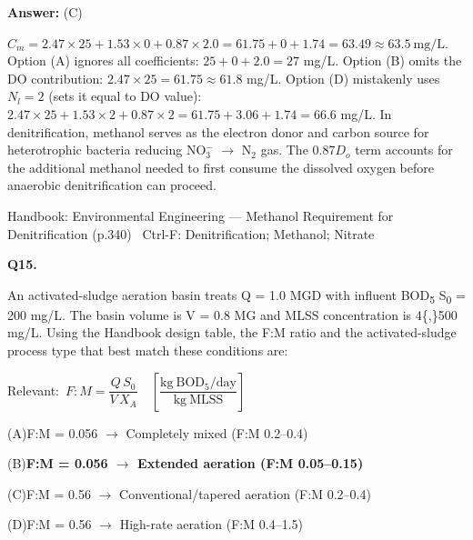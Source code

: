\documentclass[11pt]{article}
\newcommand{\correct}[1]{\textbf{#1}\;{\color{accent}$\checkmark$}}
\newcommand{\optline}[2]{\par\noindent\hspace{1.2em}(#1)\hspace{0.6em}#2}
\begin{document}
\vspace{2pt}\par\noindent\colorbox{boxbg}{\parbox{\dimexpr\linewidth-2\fboxsep\relax}{%
\vspace{2pt}\textbf{Answer:} (C)\par\vspace{2pt}
{\small $C_m = 2.47\times25 + 1.53\times0 + 0.87\times2.0 = 61.75 + 0 + 1.74 = 63.49\approx63.5\ \mathrm{mg/L}$. Option (A) ignores all coefficients: $25+0+2.0 = 27$ mg/L. Option (B) omits the DO contribution: $2.47\times25 = 61.75\approx61.8$ mg/L. Option (D) mistakenly uses $N_l = 2$ (sets it equal to DO value): $2.47\times25+1.53\times2+0.87\times2 = 61.75+3.06+1.74 = 66.6$ mg/L. In denitrification, methanol serves as the electron donor and carbon source for heterotrophic bacteria reducing NO$_3^-$ $\rightarrow$ N$_2$ gas. The 0.87$D_o$ term accounts for the additional methanol needed to first consume the dissolved oxygen before anaerobic denitrification can proceed.}\par\vspace{2pt}
{\footnotesize\color{soft}Handbook: Environmental Engineering --- Methanol Requirement for Denitrification (p.340) \textbullet\ Ctrl-F: Denitrification; Methanol; Nitrate}\vspace{2pt}
}}
\vspace{9pt}
\filbreak
\textbf{\color{accent}Q15.}\par\vspace{2pt}
An activated-sludge aeration basin treats Q = 1.0 MGD with influent BOD\textsubscript{5} S\textsubscript{0} = 200 mg/L. The basin volume is V = 0.8 MG and MLSS concentration is 4\{,\}500 mg/L. Using the Handbook design table, the F:M ratio and the activated-sludge process type that best match these conditions are:\par\vspace{3pt}
{\small\color{soft}Relevant:}\ $F:M = \dfrac{Q\,S_0}{V\,X_A}\quad\left[\dfrac{\mathrm{kg\ BOD_5/day}}{\mathrm{kg\ MLSS}}\right]$\par\vspace{3pt}
\optline{A}{F:M = 0.056 $\rightarrow$ Completely mixed (F:M 0.2--0.4)}
\optline{B}{\correct{F:M = 0.056 $\rightarrow$ Extended aeration (F:M 0.05--0.15)}}
\optline{C}{F:M = 0.56 $\rightarrow$ Conventional/tapered aeration (F:M 0.2--0.4)}
\optline{D}{F:M = 0.56 $\rightarrow$ High-rate aeration (F:M 0.4--1.5)}
\end{document}
